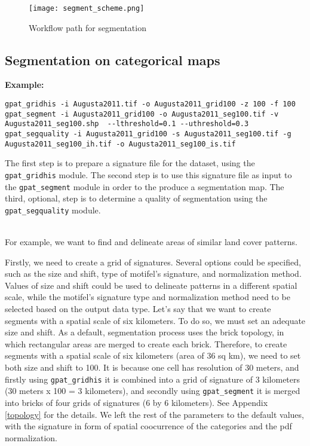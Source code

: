 \begin{figure}[H]
	\centering
	\texttt{[image: segment\_scheme.png]}
	\caption{Workflow path for segmentation}
	\label{FIG:SEGMENT}
\end{figure}

\subsection{Segmentation on categorical maps}

{\bf Example:}

\begin{minipage}{\linewidth}
\begin{lstlisting}
gpat_gridhis -i Augusta2011.tif -o Augusta2011_grid100 -z 100 -f 100
gpat_segment -i Augusta2011_grid100 -o Augusta2011_seg100.tif -v Augusta2011_seg100.shp  --lthreshold=0.1 --uthreshold=0.3
gpat_segquality -i Augusta2011_grid100 -s Augusta2011_seg100.tif -g Augusta2011_seg100_ih.tif -o Augusta2011_seg100_is.tif
\end{lstlisting}
\end{minipage}

The first step is to prepare a signature file for the dataset, using the {\tt gpat\_gridhis} module.
The second step is to use this signature file as input to the {\tt gpat\_segment} module in order to the produce a segmentation map. 
The third, optional, step is to determine a quality of segmentation using the {\tt gpat\_segquality} module.\\\\

\newpage

For example, we want to find and delineate areas of similar land cover patterns. 

Firstly, we need to create a grid of signatures. 
Several options could be specified, such as the size and shift, type of motifel's signature, and normalization method.
Values of size and shift could be used to delineate patterns in a different spatial scale, while the motifel's signature type and normalization method need to be selected based on the output data type.
Let's say that we want to create segments with a spatial scale of six kilometers. 
To do so, we must set an adequate size and shift. 
As a default, segmentation process uses the brick topology, in which rectangular areas are merged to create each brick.
Therefore, to create segments with a spatial scale of six kilometers (area of 36 sq km), we need to set both size and shift to 100.
It is because one cell has resolution of 30 meters, and firstly using {\tt gpat\_gridhis} it is combined into a grid of signature of 3 kilometers (30 meters x 100 = 3 kilometers), and secondly using {\tt gpat\_segment} it is merged into bricks of four grids of signatures (6 by 6 kilometers). 
See Appendix \ref{topology} for the details.
We left the rest of the parameters to the default values, with the signature in form of spatial coocurrence of the categories and the pdf normalization.

